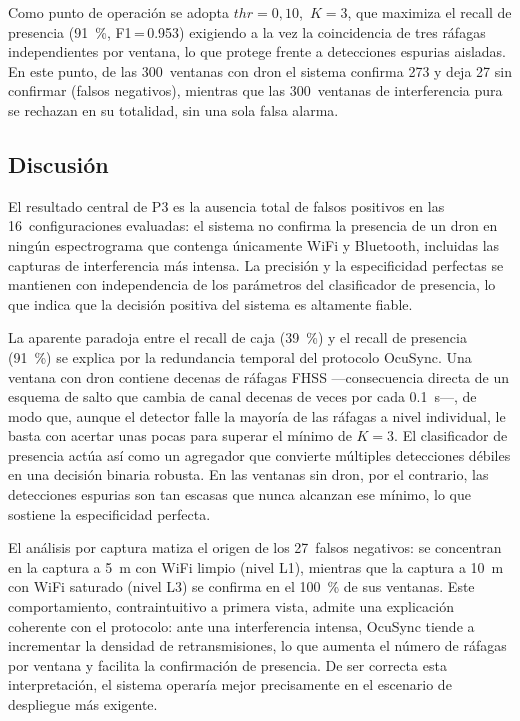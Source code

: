 \FloatBarrier
Como punto de operación se adopta $\mathit{thr}=0{,}10$,\, $K=3$, que maximiza el recall de presencia (\SI{91}{\percent}, F1\,=\,\num{0,953}) exigiendo a la vez la coincidencia de tres ráfagas independientes por ventana, lo que protege frente a detecciones espurias aisladas. En este punto, de las \num{300}~ventanas con dron el sistema confirma \num{273} y deja \num{27} sin confirmar (falsos negativos), mientras que las \num{300}~ventanas de interferencia pura se rechazan en su totalidad, sin una sola falsa alarma.


\subsection{Discusión}
\label{sec:p3_discusion}

El resultado central de P3 es la ausencia total de falsos positivos en las \num{16}~configuraciones evaluadas: el sistema no confirma la presencia de un dron en ningún espectrograma que contenga únicamente WiFi y Bluetooth, incluidas las capturas de interferencia más intensa. La precisión y la especificidad perfectas se mantienen con independencia de los parámetros del clasificador de presencia, lo que indica que la decisión positiva del sistema es altamente fiable.

La aparente paradoja entre el recall de caja (\SI{39}{\percent}) y el recall de presencia (\SI{91}{\percent}) se explica por la redundancia temporal del protocolo OcuSync. Una ventana con dron contiene decenas de ráfagas FHSS ---consecuencia directa de un esquema de salto que cambia de canal decenas de veces por cada \SI{0.1}{\second}---, de modo que, aunque el detector falle la mayoría de las ráfagas a nivel individual, le basta con acertar unas pocas para superar el mínimo de $K=3$. El clasificador de presencia actúa así como un agregador que convierte múltiples detecciones débiles en una decisión binaria robusta. En las ventanas sin dron, por el contrario, las detecciones espurias son tan escasas que nunca alcanzan ese mínimo, lo que sostiene la especificidad perfecta.

El análisis por captura matiza el origen de los \num{27}~falsos negativos: se concentran en la captura a \SI{5}{\meter} con WiFi limpio (nivel L1), mientras que la captura a \SI{10}{\meter} con WiFi saturado (nivel L3) se confirma en el \SI{100}{\percent} de sus ventanas. Este comportamiento, contraintuitivo a primera vista, admite una explicación coherente con el protocolo: ante una interferencia intensa, OcuSync tiende a incrementar la densidad de retransmisiones, lo que aumenta el número de ráfagas por ventana y facilita la confirmación de presencia. De ser correcta esta interpretación, el sistema operaría mejor precisamente en el escenario de despliegue más exigente.

